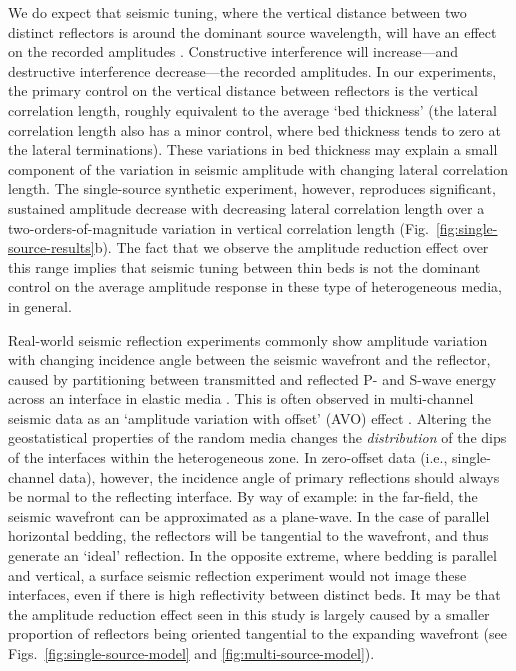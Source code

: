 \documentclass[se,manuscript]{copernicus}
\begin{document}
We do expect that seismic tuning, where the vertical distance between two distinct reflectors is around the dominant source wavelength, will have an effect on the recorded amplitudes \citep{chung_quantitative_1999}.
Constructive interference will increase---and destructive interference  decrease---the recorded amplitudes.
In our experiments, the primary control on the vertical distance between reflectors is the vertical correlation length, roughly equivalent to the average `bed thickness’ (the lateral correlation length also has a minor control, where bed thickness tends to zero at the lateral terminations).
These variations in bed thickness may explain a small component of the variation in seismic amplitude with changing lateral correlation length.
The single-source synthetic experiment, however, reproduces significant, sustained amplitude decrease with decreasing lateral correlation length over a two-orders-of-magnitude variation in vertical correlation length (Fig.~\ref{fig:single-source-results}b).
The fact that we observe the amplitude reduction effect over this range implies that seismic tuning between thin beds is not the dominant control on the average amplitude response in these type of heterogeneous media, in general.

Real-world seismic reflection experiments commonly show amplitude variation with changing incidence angle between the seismic wavefront and the reflector, caused by partitioning between transmitted and reflected P- and S-wave energy across an interface in elastic media \citep{shuey_simplification_1985}.
This is often observed in multi-channel seismic data as an ‘amplitude variation with offset’ (AVO) effect \citep{avseth2010quantitative}.
Altering the geostatistical properties of the random media changes the \emph{distribution} of the dips of the interfaces within the heterogeneous zone.
In zero-offset data (i.e., single-channel data), however, the incidence angle of primary reflections should always be normal to the reflecting interface.
By way of example: in the far-field, the seismic wavefront can be approximated as a plane-wave.
In the case of parallel horizontal bedding, the reflectors will be tangential to the wavefront, and thus generate an `ideal' reflection.
In the opposite extreme, where bedding is parallel and vertical, a surface seismic reflection experiment would not image these interfaces, even if there is high reflectivity between distinct beds.
It may be that the amplitude reduction effect seen in this study is largely caused by a smaller proportion of reflectors being oriented tangential to the expanding wavefront (see Figs.~\ref{fig:single-source-model} and \ref{fig:multi-source-model}).
\end{document}
